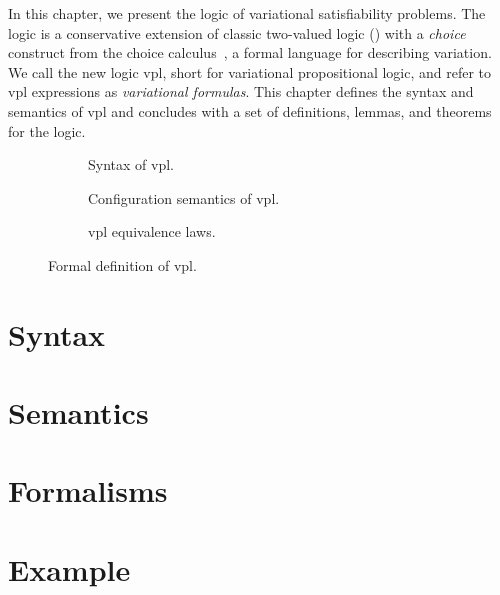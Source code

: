 \label{chapter:vpl}
%
In this chapter, we present the logic of variational satisfiability problems.
%
The logic is a conservative extension of classic two-valued logic (\pl{})
with a \emph{choice} construct from the choice
calculus~\cite{EW11tosem,Walk13thesis}, a formal language for describing
variation. We call the new logic \acs{vpl}, short for variational propositional
logic, and refer to \ac{vpl} expressions as \emph{variational formulas}.
%
This chapter defines the syntax and semantics of \ac{vpl} and concludes with a
set of definitions, lemmas, and theorems for the logic.
%
\begin{figure}
  \begin{subfigure}[t]{\linewidth}
    \centering
    
    \caption{Syntax of \ac{vpl}.}%
    \label{fig:cc:stx}
  \end{subfigure}
%
  \begin{subfigure}[t]{\linewidth}
    
    \centering
    \caption{Configuration semantics of \ac{vpl}.}%
    \label{fig:cc:cfg}
  \end{subfigure}
%
  \begin{subfigure}[t]{\linewidth}
    
    \centering
    \caption{\ac{vpl} equivalence laws.}%
    \label{fig:cc:eqv}
  \end{subfigure}
\caption{Formal definition of \ac{vpl}.}%
\label{fig:cc}
\end{figure}
%
%
\section{Syntax}

%
\section{Semantics}

%
\section{Formalisms}

%
\section{Example}


